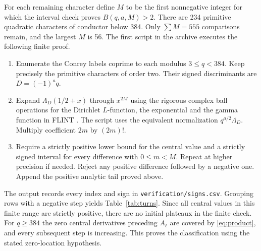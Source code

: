 \documentclass[11pt]{article}
\newcommand{\LL}{\Lambda}
\numberwithin{equation}{section}
\begin{document}
For each remaining character define $M$ to be the first nonnegative integer for which the interval check proves $B(q,a,M)>2$. There are 234 primitive quadratic characters of conductor below 384. Only $\sum M=555$ comparisons remain, and the largest $M$ is 56. The first script in the archive executes the following finite proof.
\begin{enumerate}
\item Enumerate the Conrey labels coprime to each modulus $3\le q<384$. Keep precisely the primitive characters of order two. Their signed discriminants are $D=(-1)^a q$.
\item Expand $\LL_D(1/2+x)$ through $x^{2M}$ using the rigorous complex ball operations for the Dirichlet $L$-function, the exponential and the gamma function in FLINT \cite{flint}. The script uses the equivalent normalization $q^{a/2}\LL_D$. Multiply coefficient $2m$ by $(2m)!$.
\item Require a strictly positive lower bound for the central value and a strictly signed interval for every difference with $0\le m<M$. Repeat at higher precision if needed. Reject any positive difference followed by a negative one. Append the positive analytic tail proved above.
\end{enumerate}
The output records every index and sign in \texttt{verification/signs.csv}. Grouping rows with a negative step yields Table~\ref{tab:turns}. Since all central values in this finite range are strictly positive, there are no initial plateaux in the finite check. For $q\ge384$ the zero central derivatives preceding $A_\ell$ are covered by \eqref{eq:product}, and every subsequent step is increasing. This proves the classification using the stated zero-location hypothesis.
\end{document}
